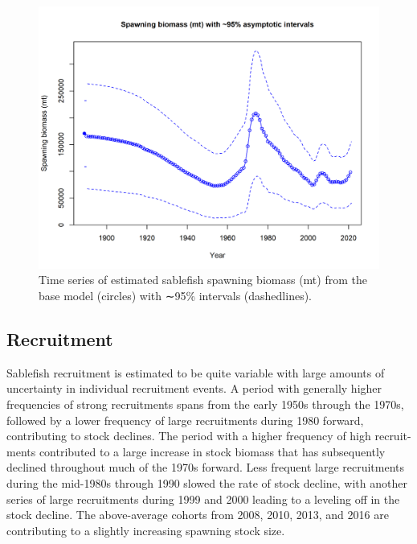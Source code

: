 \documentclass[11pt,
  english,
  a4paper,
]{article}
\begin{document}

\begin{figure}
\centering
\includegraphics[width=1\textwidth,height=1\textheight]{figs/ts7_Spawning_biomass_mt_with_95_asymptotic_intervals_intervals.png}
\caption{Time series of estimated sablefish spawning biomass (mt) from the base model (circles) with ∼95\% intervals (dashedlines).}
\end{figure}

\tagmcend\tagstructend


\hypertarget{recruitment}{%
\subsection*{Recruitment}\label{recruitment}}

\leavevmode\tagmcend\tagstructend


Sablefish recruitment is estimated to be quite variable with large amounts of uncertainty in individual recruitment events. A period with generally higher frequencies of strong recruitments spans from the early 1950s through the 1970s, followed by a lower frequency of large recruitments during 1980 forward, contributing to stock declines. The period with a higher frequency of high recruit- ments contributed to a large increase in stock biomass that has subsequently declined throughout much of the 1970s forward. Less frequent large recruitments during the mid-1980s through 1990 slowed the rate of stock decline, with another series of large recruitments during 1999 and 2000 leading to a leveling off in the stock decline. The above-average cohorts from 2008, 2010, 2013, and 2016 are contributing to a slightly increasing spawning stock size.
\end{document}
